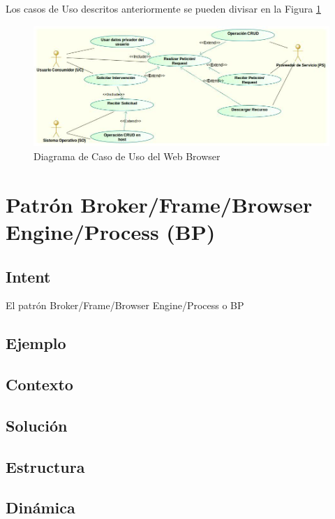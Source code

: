 		Los casos de Uso descritos anteriormente se pueden divisar en la Figura \ref{fig:CUBrowser}

	    \begin{figure}[h]
	        \centering
	        \includegraphics[scale=0.45]{figures/CUBrowser.jpg}
	        \caption{Diagrama de Caso de Uso del Web Browser}
	        \label{fig:CUBrowser}
	    \end{figure}



\section{Patrón Broker/Frame/Browser Engine/Process (BP)}
\label{chap4:BrokerPatt}
\subsection*{Intent}
El patrón Broker/Frame/Browser Engine/Process o BP 


\subsection*{Ejemplo}

\subsection*{Contexto}

\subsection*{Solución}

\subsection*{Estructura}

\subsection*{Dinámica}

